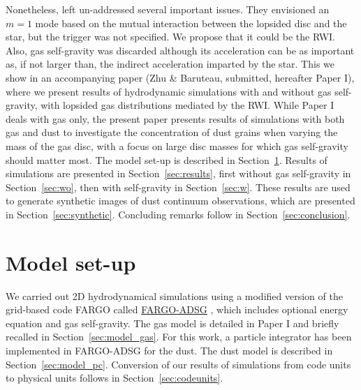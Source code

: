\documentclass[a4paper,usenatbib]{mnras}
\begin{document}
Nonetheless, \cite{MC15} left un-addressed several important issues.
They envisioned an $m=1$ mode based on the mutual interaction between
the lopsided disc and the star, but the trigger was not specified. We
propose that it could be the RWI. Also, gas self-gravity was discarded
although its acceleration can be as important as, if not larger than,
the indirect acceleration imparted by the star.  This we show in an
accompanying paper (Zhu \& Baruteau, submitted, hereafter Paper I),
where we present results of hydrodynamic simulations with and without
gas self-gravity, with lopsided gas distributions mediated by the
RWI. While Paper I deals with gas only, the present paper presents
results of simulations with both gas and dust to investigate the
concentration of dust grains when varying the mass of the gas disc,
with a focus on large disc masses for which gas self-gravity should
matter most. The model set-up is described in
Section~\ref{sec:setup}. Results of simulations are presented in
Section~\ref{sec:results}, first without gas self-gravity in
Section~\ref{sec:wo}, then with self-gravity in
Section~\ref{sec:w}. These results are used to generate synthetic
images of dust continuum observations, which are presented in
Section~\ref{sec:synthetic}. Concluding remarks follow in
Section~\ref{sec:conclusion}.



\section{Model set-up}
\label{sec:setup}
We carried out 2D hydrodynamical simulations using a modified version
of the grid-based code FARGO \citep{fargo1} called
\href{http://fargo.in2p3.fr/-FARGO-ADSG-}{FARGO-ADSG} \citep{BM08a,
  BM08b}, which includes optional energy equation and gas
self-gravity. The gas model is detailed in Paper I and briefly
recalled in Section~\ref{sec:model_gas}. For this work, a particle
integrator has been implemented in FARGO-ADSG for the dust. The dust
model is described in Section~\ref{sec:model_pc}. Conversion of our
results of simulations from code units to physical units follows in
Section~\ref{sec:codeunits}.

\end{document}

